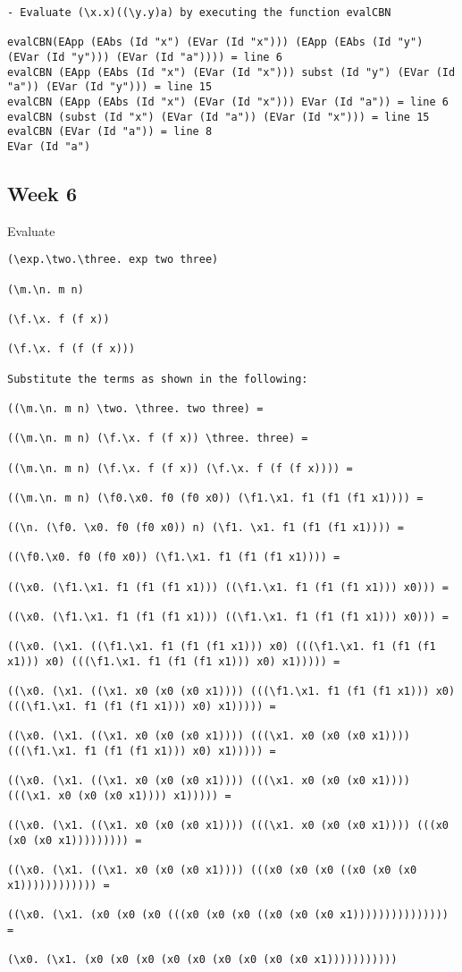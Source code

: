 \documentclass{article}
\theoremstyle{theorem}
\theoremstyle{definition}
\theoremstyle{remark}
\begin{document}
\begin{lstlisting}
- Evaluate (\x.x)((\y.y)a) by executing the function evalCBN

evalCBN(EApp (EAbs (Id "x") (EVar (Id "x"))) (EApp (EAbs (Id "y") (EVar (Id "y"))) (EVar (Id "a")))) = line 6
evalCBN (EApp (EAbs (Id "x") (EVar (Id "x"))) subst (Id "y") (EVar (Id "a")) (EVar (Id "y"))) = line 15
evalCBN (EApp (EAbs (Id "x") (EVar (Id "x"))) EVar (Id "a")) = line 6
evalCBN (subst (Id "x") (EVar (Id "a")) (EVar (Id "x"))) = line 15
evalCBN (EVar (Id "a")) = line 8
EVar (Id "a")
\end{lstlisting}
%

\subsection{Week 6}
Evaluate
\begin{lstlisting}
(\exp.\two.\three. exp two three)

(\m.\n. m n)

(\f.\x. f (f x))

(\f.\x. f (f (f x)))

Substitute the terms as shown in the following:

((\m.\n. m n) \two. \three. two three) =

((\m.\n. m n) (\f.\x. f (f x)) \three. three) =

((\m.\n. m n) (\f.\x. f (f x)) (\f.\x. f (f (f x)))) =

((\m.\n. m n) (\f0.\x0. f0 (f0 x0)) (\f1.\x1. f1 (f1 (f1 x1)))) =

((\n. (\f0. \x0. f0 (f0 x0)) n) (\f1. \x1. f1 (f1 (f1 x1)))) =

((\f0.\x0. f0 (f0 x0)) (\f1.\x1. f1 (f1 (f1 x1)))) =

((\x0. (\f1.\x1. f1 (f1 (f1 x1))) ((\f1.\x1. f1 (f1 (f1 x1))) x0))) =

((\x0. (\f1.\x1. f1 (f1 (f1 x1))) ((\f1.\x1. f1 (f1 (f1 x1))) x0))) =

((\x0. (\x1. ((\f1.\x1. f1 (f1 (f1 x1))) x0) (((\f1.\x1. f1 (f1 (f1 x1))) x0) (((\f1.\x1. f1 (f1 (f1 x1))) x0) x1))))) =

((\x0. (\x1. ((\x1. x0 (x0 (x0 x1)))) (((\f1.\x1. f1 (f1 (f1 x1))) x0) (((\f1.\x1. f1 (f1 (f1 x1))) x0) x1))))) =

((\x0. (\x1. ((\x1. x0 (x0 (x0 x1)))) (((\x1. x0 (x0 (x0 x1)))) (((\f1.\x1. f1 (f1 (f1 x1))) x0) x1))))) =

((\x0. (\x1. ((\x1. x0 (x0 (x0 x1)))) (((\x1. x0 (x0 (x0 x1)))) (((\x1. x0 (x0 (x0 x1)))) x1))))) =

((\x0. (\x1. ((\x1. x0 (x0 (x0 x1)))) (((\x1. x0 (x0 (x0 x1)))) (((x0 (x0 (x0 x1))))))))) =

((\x0. (\x1. ((\x1. x0 (x0 (x0 x1)))) (((x0 (x0 (x0 ((x0 (x0 (x0 x1)))))))))))) =

((\x0. (\x1. (x0 (x0 (x0 (((x0 (x0 (x0 ((x0 (x0 (x0 x1))))))))))))))) =

(\x0. (\x1. (x0 (x0 (x0 (x0 (x0 (x0 (x0 (x0 (x0 x1)))))))))))
\end{lstlisting}
%
\end{document}
